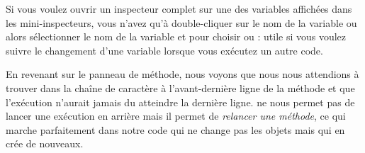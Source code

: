 \documentclass[a4paper,10pt,twoside]{book}
\begin{document}
Si vous voulez ouvrir un inspecteur complet sur une des variables
affichées dans les mini-inspecteurs, vous n'avez qu'à double-cliquer
sur le nom de la variable ou alors sélectionner le nom de la variable et 
\actclickz pour choisir
  ou : %
utile si vous voulez suivre le changement d'une variable lorsque vous exécutez un autre code.

En revenant sur le panneau de méthode, nous voyons que nous
nous attendions à trouver  dans la chaîne de caractère
 à l'avant-dernière ligne de la méthode et que 
l'exécution n'aurait jamais du atteindre la dernière ligne.
\pharo ne nous permet pas de lancer une exécution en arrière mais
il permet de \emph{relancer une méthode}, ce qui marche parfaitement dans
notre code qui ne change pas les objets mais qui en crée de nouveaux.

\end{document}
